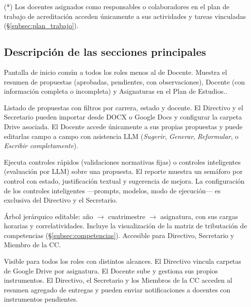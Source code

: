 \noindent\small(*) Los docentes asignados como responsables o colaboradores
en el plan de trabajo de acreditación acceden únicamente a sus actividades
y tareas vinculadas (\S\ref{subsec:plan_trabajo}).
\normalsize

\subsection*{Descripción de las secciones principales}

\begin{description}[noitemsep, leftmargin=0pt]
  \item[\textbf{Dashboard}]
    Pantalla de inicio común a todos los roles menos al de Docente.
    Muestra el resumen de propuestas (aprobadas, pendientes, con
    observaciones), Docente (con información completa o incompleta) y Asignaturas en el Plan de Estudios..

  \item[\textbf{Propuestas}]
    Listado de propuestas con filtros por carrera, estado y docente.
    El Directivo y el Secretario pueden importar desde DOCX o Google Docs
    y configurar la carpeta Drive asociada.
    El Docente accede únicamente a sus propias propuestas y puede editarlas
    campo a campo con asistencia LLM (\textit{Sugerir}, \textit{Generar},
    \textit{Reformular}, o \textit{Escribir completamente}).

  \item[\textbf{Control de propuestas}]
    Ejecuta controles rápidos (validaciones normativas fijas) o controles
    inteligentes (evaluación por LLM) sobre una propuesta.
    El reporte muestra un semáforo por control con estado, justificación
    textual y sugerencia de mejora.
    La configuración de los controles inteligentes —prompts, modelos,
    modo de ejecución— es exclusiva del Directivo y el Secretario.

  \item[\textbf{Plan de estudios}]
    Árbol jerárquico editable: año $\to$ cuatrimestre $\to$ asignatura,
    con sus cargas horarias y correlatividades.
    Incluye la visualización de la matriz de tributación de competencias
    (\S\ref{subsec:competencias}).
    Accesible para Directivo, Secretario y Miembro de la CC.

  \item[\textbf{Instrumentos evaluativos}]
    Visible para todos los roles con distintos alcances.
    El Directivo vincula carpetas de Google Drive por asignatura.
    El Docente sube y gestiona sus propios instrumentos.
    El Directivo, el Secretario y los Miembros de la CC acceden al resumen agregado de entregas
    y pueden enviar notificaciones a docentes con instrumentos pendientes.


\end{description}

